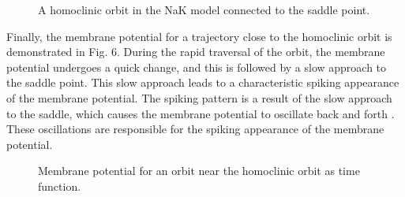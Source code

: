 \documentclass[12pt,a4paper]{report}
\begin{document}
\begin{figure}[H]
    \centering %
    \caption{A homoclinic orbit in the NaK model connected to the saddle point.\cite{ref9}} 
    \end{figure}
    
    Finally, the membrane potential for a trajectory close to the homoclinic orbit is demonstrated in Fig. 6. During the rapid traversal of the orbit, the membrane potential undergoes a quick change, and this is followed by a slow approach to the saddle point. This slow approach leads to a characteristic spiking appearance of the membrane potential. The spiking pattern is a result of the slow approach to the saddle, which causes the membrane potential to oscillate back and forth \cite{ref10}. These oscillations are responsible for the spiking appearance of the membrane potential.
    
    \begin{figure}[H]
    \centering %
    \caption{Membrane potential for an orbit near the homoclinic orbit as time function.\cite{ref10}} 
\end{figure}
\end{document}
